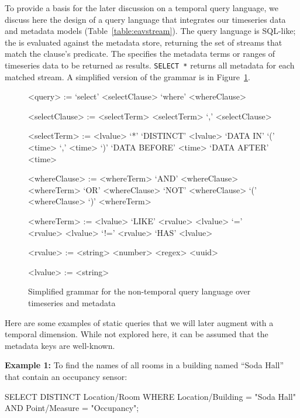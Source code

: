 To provide a basis for the later discussion on a temporal query language, we
discuss here the design of a query language that integrates our timeseries data
and metadata models (Table~\ref{table:eavstream}).  The query language is
SQL-like; the  is evaluated against the metadata store,
returning the set of streams that match the clause's predicate. The
 specifies the metadata terms or ranges of timeseries data
to be returned as results. \texttt{SELECT *} returns all metadata for each
matched stream.  A simplified version of the grammar is in
Figure~\ref{fig:nontemporalgrammar}.

\setlength{\grammarindent}{8em}
\setlength{\grammarparsep}{4pt}
\begin{figure}
\centering
\begin{grammar}
<query> := `select' <selectClause> `where' <whereClause>

<selectClause> := <selectTerm>
\alt <selectTerm> `,' <selectClause>

<selectTerm> := <lvalue>
\alt `*'
\alt `DISTINCT' <lvalue>
\alt `DATA IN' `(' <time> `,' <time> `)'
\alt `DATA BEFORE' <time>
\alt `DATA AFTER' <time>

<whereClause> := <whereTerm> `AND' <whereClause>
\alt <whereTerm> `OR' <whereClause>
\alt `NOT' <whereClause>
\alt `(' <whereClause> `)'
\alt <whereTerm>

<whereTerm> := <lvalue> `LIKE' <rvalue>
\alt <lvalue> `=' <rvalue>
\alt <lvalue> `!=' <rvalue>
\alt `HAS' <lvalue>

<rvalue> := <string>
\alt <number>
\alt <regex>
\alt <uuid>

<lvalue> := <string>
\end{grammar}
\caption{Simplified grammar for the non-temporal query language over timeseries and metadata}
\label{fig:nontemporalgrammar}
\end{figure}

Here are some examples of static queries that we will later augment with a temporal dimension.
While not explored here, it can be assumed that the metadata keys are well-known.

\textbf{Example 1:}
To find the names of all rooms in a building named ``Soda Hall'' that contain an occupancy sensor:

\begin{sqlcode}
SELECT DISTINCT Location/Room WHERE
Location/Building = "Soda Hall" AND
Point/Measure = "Occupancy";
\end{sqlcode}

